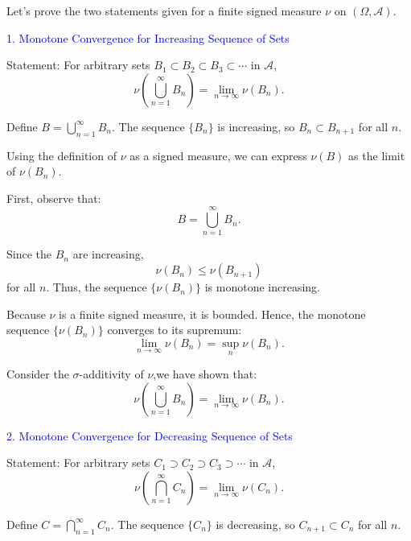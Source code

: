 \documentclass{report}
\begin{document}
\begin{myproof}
    Let's prove the two statements given for a finite signed measure \(\nu\) on \((\Omega, \mathcal{A})\).

\textcolor{blue}{1. Monotone Convergence for Increasing Sequence of Sets}

Statement: For arbitrary sets \(B_1 \subset B_2 \subset B_3 \subset \cdots\) in \(\mathcal{A}\),
\[ \nu\left(\bigcup_{n=1}^\infty B_n\right) = \lim_{n \to \infty} \nu(B_n). \]


Define \(B = \bigcup_{n=1}^\infty B_n\). The sequence \(\{B_n\}\) is increasing, so \(B_n \subset B_{n+1}\) for all \(n\). 

Using the definition of \(\nu\) as a signed measure, we can express \(\nu(B)\) as the limit of \(\nu(B_n)\).

First, observe that:
\[ B = \bigcup_{n=1}^\infty B_n. \]

Since the \(B_n\) are increasing,
\[ \nu(B_n) \leq \nu(B_{n+1}) \]
for all \(n\). Thus, the sequence \(\{\nu(B_n)\}\) is monotone increasing.

Because \(\nu\) is a finite signed measure, it is bounded. Hence, the monotone sequence \(\{\nu(B_n)\}\) converges to its supremum:
\[ \lim_{n \to \infty} \nu(B_n) = \sup_n \nu(B_n). \]

Consider the \(\sigma\)-additivity of \(\nu\),we have shown that:
\[ \nu\left(\bigcup_{n=1}^\infty B_n\right) = \lim_{n \to \infty} \nu(B_n). \]

\textcolor{blue}{2. Monotone Convergence for Decreasing Sequence of Sets}

Statement: For arbitrary sets \(C_1 \supset C_2 \supset C_3 \supset \cdots\) in \(\mathcal{A}\),
\[ \nu\left(\bigcap_{n=1}^\infty C_n\right) = \lim_{n \to \infty} \nu(C_n). \]


Define \(C = \bigcap_{n=1}^\infty C_n\). The sequence \(\{C_n\}\) is decreasing, so \(C_{n+1} \subset C_n\) for all \(n\).


\end{myproof}
\end{document}
